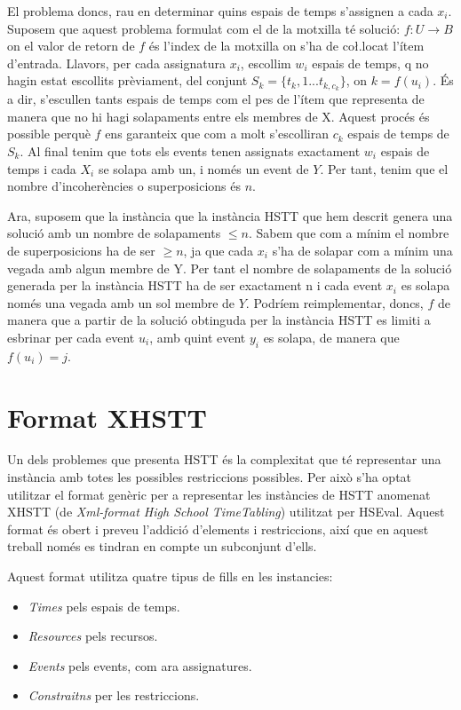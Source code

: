 \documentclass[11pt,a4paper,twoside]{report}
\begin{document}
    El problema doncs, rau en determinar quins espais de temps s'assignen a cada $x_i$. 
    Suposem que aquest problema formulat com el de la motxilla té solució: $f: U \rightarrow B$ on el valor de retorn de $f$ és l'index de la motxilla on s'ha de co\l.locat l'ítem d'entrada. 
    Llavors, per cada assignatura $x_i$, escollim $w_i$ espais de temps, q no hagin estat escollits prèviament, del conjunt $S_k = \{t_k,1 ... t_{k, c_k}\}$, on $k = f(u_i)$. 
    És a dir, s'escullen tants espais de temps com el pes de l'ítem que representa de manera que no hi hagi solapaments entre els membres de X. Aquest procés és possible perquè $f$ ens garanteix que com a molt s'escolliran $c_k$ espais de temps de $S_k$. 
    Al final tenim que tots els events tenen assignats exactament $w_i$ espais de temps i cada $X_i$ se solapa amb un, i només un event de $Y$. Per tant, tenim que el nombre d'incoherències o superposicions és $n$.
    
    Ara, suposem que la instància que la instància HSTT que hem descrit genera una solució amb un nombre de solapaments $\leq n$. Sabem que com a mínim el nombre de superposicions ha de ser $\geq n$, ja que cada $x_i$ 
    s'ha de solapar com a mínim una vegada amb algun membre de Y. Per tant el nombre de solapaments de la solució generada per la instància HSTT ha de ser exactament n i cada event $x_i$ es solapa només una vegada amb un sol membre de $Y$.
    Podríem reimplementar, doncs, $f$ de manera que a partir de la solució obtinguda per la instància HSTT es limiti a esbrinar per cada event $u_i$, amb quint event $y_i$ es solapa, de manera que $f(u_i) =j$.

  \section{Format XHSTT}
  Un dels problemes que presenta HSTT és la complexitat que té representar una instància amb totes les possibles restriccions possibles. Per això s'ha optat utilitzar el format genèric per a representar les instàncies de HSTT anomenat XHSTT (de \textit{Xml-format High School TimeTabling}) utilitzat per HSEval\cite{xhstt}.
  Aquest format és obert i preveu l'addició d'elements i restriccions, així que en aquest treball només es tindran en compte un subconjunt d'ells.
  
  Aquest format utilitza quatre tipus de fills en les instancies:
  \begin{itemize}
    \item \textit{Times} pels espais de temps.
    \item \textit{Resources} pels recursos.
    \item \textit{Events} pels events, com ara assignatures.
    \item \textit{Constraitns} per les restriccions.
  \end{itemize}
\end{document}

